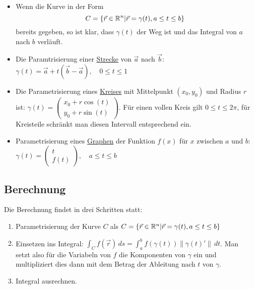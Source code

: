 \begin{itemize}[leftmargin=*]
	\item Wenn die Kurve in der Form
	\[
	C = \{\vec{r} \in \mathbb{R}^n | \vec{r} = \gamma(t), a \leq t \leq b\}
	\]
	bereits gegeben, so ist klar, dass $\gamma(t)$ der Weg ist und das Integral von
	$a$ nach $b$ verläuft.
	
	\item Die Paramtrisierung einer \underline{Strecke} von $\vec{a}$ nach $\vec{b}$:
	$\gamma(t) = \vec{a} + t(\vec{b}-\vec{a}), \quad 0 \leq t \leq 1$
	
	\item Die Parametrisierung eines \underline{Kreises} mit Mittelpunkt $(x_0, y_0)$ und
	Radius $r$ ist: $\gamma(t) =
	\begin{pmatrix}
	x_0 + r \cos(t)\\
	y_0 + r \sin(t)
	\end{pmatrix}$. Für einen vollen Kreis gilt $0 \leq t \leq 2\pi$, für Kreisteile
	schränkt man diesen Intervall entsprechend ein.
	
	\item Parametrisierung eines \underline{Graphen} der Funktion $f(x)$ für $x$
	zwischen $a$ und $b$: $\gamma(t) =
	\begin{pmatrix}
	t\\
	f(t)
	\end{pmatrix}, \quad a \leq t \leq b$
\end{itemize}

\subsection{Berechnung}
Die Berechnung findet in drei Schritten statt:
\begin{enumerate}[leftmargin=*]
	\item Parametrisierung der Kurve $C$ als $C = \{\vec{r} \in \mathbb{R}^n | \vec{r} = \gamma(t), a \leq t \leq b\}$
	\item Einsetzen ins Integral: $\int_C f(\vec{r})\,ds = \int_a^b f(\gamma(t)) \|\gamma(t)'\|\,dt$.
	Man setzt also für die Variabeln von $f$ die Komponenten von $\gamma$ ein und
	multipliziert dies dann mit dem Betrag der Ableitung nach $t$ von $\gamma$.
	\item Integral ausrechnen.
\end{enumerate}
